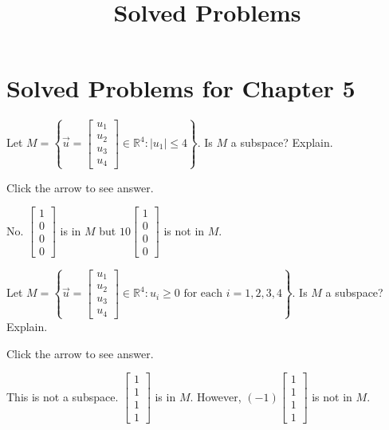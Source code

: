 \documentclass{ximera}
\title{Solved Problems} \license{CC BY-NC-SA 4.0}
\begin{document}
\begin{abstract}
\end{abstract}
\maketitle

\section*{Solved Problems for Chapter 5}

\begin{problem}\label{prb:5.10} Let $M=\left\{ \vec{u}=\left[ \begin{array}{c}
u_{1} \\
u_{2} \\
u_{3} \\
u_{4}
\end{array}\right] \in
\mathbb{R}^{4}:|u_{1}| \leq 4\right\} .$ Is $M$ a
subspace? Explain.

Click the arrow to see answer.  
\begin{expandable}
No. $\left[
\begin{array}{r}
1 \\
0 \\
0 \\
0
\end{array}
\right]$ is in $M$ but $10\left[ \begin{array}{r}
1 \\
0 \\
0 \\
0
\end{array}
\right]$ is not in $M$.
\end{expandable}
\end{problem}

\begin{problem}\label{prb:5.11} Let $M=\left\{ \vec{u}=\left[ \begin{array}{c}
u_{1} \\
u_{2} \\
u_{3} \\
u_{4}
\end{array}\right] \in
\mathbb{R}^{4}:u_{i}\geq 0\text{ for each }i=1,2,3,4\right\} .$ Is $M$ a
subspace? Explain.

Click the arrow to see answer.  
\begin{expandable}
This is not a subspace. $\left[ \begin{array}{r}
1 \\
1 \\
1 \\
1
\end{array}
\right] $
is in $M$. However, $\left( -1\right) \left[
\begin{array}{r}
1 \\
1 \\
1 \\
1
\end{array}
\right] $ is not in $M$.
\end{expandable}
\end{problem}
\end{document}
